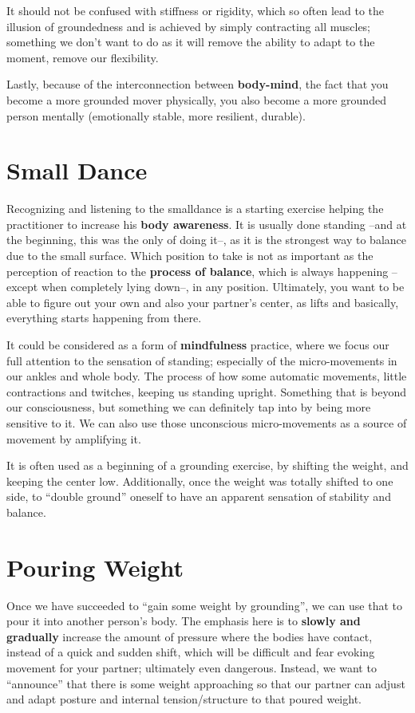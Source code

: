 It should not be confused with stiffness or rigidity, which so often lead to the illusion of groundedness and is achieved by simply contracting all muscles; something we don't want to do as it will remove the ability to adapt to the moment, remove our flexibility.

Lastly, because of the interconnection between \textbf{body-mind}, the fact that you become a more grounded mover physically, you also become a more grounded person mentally (emotionally stable, more resilient, durable).

\section{Small Dance}\label{sec:small-dance}

Recognizing and listening to the \gls{smalldance} is a starting exercise helping the practitioner to increase his \textbf{body awareness}.
It is usually done standing --and at the beginning, this was the only of doing it--, as it is the strongest way to balance due to the small surface.
Which position to take is not as important as the perception of reaction to the \textbf{process of balance}, which is always happening --except when completely lying down--, in any position.
Ultimately, you want to be able to figure out your own and also your partner's center, as lifts and basically, everything starts happening from there.

It could be considered as a form of \textbf{mindfulness} practice, where we focus our full attention to the sensation of standing; especially of the micro-movements in our ankles and whole body.
The process of how some automatic movements, little contractions and twitches, keeping us standing upright.
Something that is beyond our consciousness, but something we can definitely tap into by being more sensitive to it.
We can also use those unconscious micro-movements as a source of movement by amplifying it.

It is often used as a beginning of a grounding exercise, by shifting the weight, and keeping the center low.
Additionally, once the weight was totally shifted to one side, to ``double ground'' oneself to have an apparent sensation of stability and balance.

\section{Pouring Weight}\label{sec:pouring-weight}

Once we have succeeded to ``gain some weight by grounding'', we can use that to pour it into another person's body.
The emphasis here is to \textbf{slowly and gradually} increase the amount of pressure where the bodies have contact, instead of a quick and sudden shift, which will be difficult and fear evoking movement for your partner; ultimately even dangerous.
Instead, we want to ``announce'' that there is some weight approaching so that our partner can adjust and adapt posture and internal tension/structure to that poured weight.


